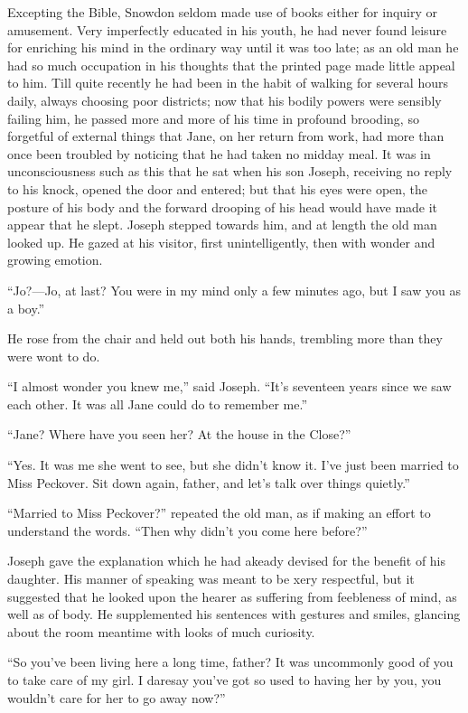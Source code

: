 Excepting the Bible, Snowdon seldom made use of books either for inquiry
or amusement. Very imperfectly educated in his youth, he had never found
leisure for enriching his mind in the ordinary way until it was too
late; as an old man he had so much occupation in his thoughts that the
printed page made little appeal to him. Till quite recently he had been
in the habit of walking for several hours daily, always choosing poor
districts; now that his bodily powers were sensibly failing him, he
passed more and more of his time in profound brooding, so forgetful of
external things that Jane, on her return from work, had more than once
been troubled by noticing that he had taken no midday meal. It was in
unconsciousness such as this that he sat when his son Joseph, receiving
no reply to his knock, opened the door and entered; but that his eyes
were open, the {\protect\hypertarget{81}{}{}}posture of his body and the
forward drooping of his head would have made it appear that he slept.
Joseph stepped towards him, and at length the old man looked up. He
gazed at his visitor, first unintelligently, then with wonder and
growing emotion.

``Jo?---Jo, at last? You were in my mind only a few minutes ago, but I
saw you as a boy.''

He rose from the chair and held out both his hands, trembling more than
they were wont to do.

``I almost wonder you knew me,'' said Joseph. ``It's seventeen years
since we saw each other. It was all Jane could do to remember me.''

``Jane? Where have you seen her? At the house in the Close?''

``Yes. It was me she went to see, but she didn't know it. I've just been
married to Miss Peckover. Sit down again, father, and let's talk over
things quietly.''

``Married to Miss Peckover?'' repeated the old man, as if making an
effort to understand {\protect\hypertarget{82}{}{}}the words. ``Then why
didn't you come here before?''

Joseph gave the explanation which he had akeady devised for the benefit
of his daughter. His manner of speaking was meant to be xery respectful,
but it suggested that he looked upon the hearer as suffering from
feebleness of mind, as well as of body. He supplemented his sentences
with gestures and smiles, glancing about the room meantime with looks of
much curiosity.

``So you've been living here a long time, father? It was uncommonly good
of you to take care of my girl. I daresay you've got so used to having
her by you, you wouldn't care for her to go away now?''

